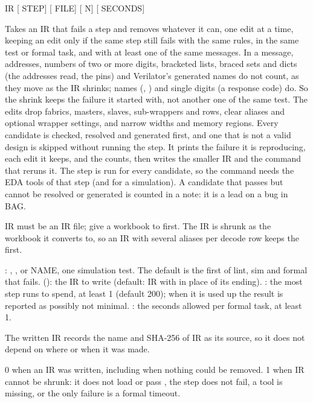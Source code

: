 \begin{entry}{ IR [ STEP] [ FILE] [ N] [ SECONDS]}
\item[Does] Takes an IR that fails a step and removes whatever it can, one edit at a time,
  keeping an edit only if the same step still fails with the same rules, in the same test or
  formal task, and with at least one of the same messages. In a message, addresses,
  numbers of two or more digits, bracketed lists, braced sets and dicts (the addresses
  read, the pins) and Verilator's generated names do not count, as they move as the IR
  shrinks; names (, ) and single digits (a response code) do. So the
  shrink keeps the failure it started with, not another one of the same test. The edits drop
  fabrics, masters, slaves, sub-wrappers and rows, clear aliases and optional wrapper
  settings, and narrow widths and memory regions. Every candidate is checked, resolved and
  generated first, and one that is not a valid design is skipped without running the step.
  It prints the failure it is reproducing, each edit it keeps, and the counts, then writes
  the smaller IR and the command that reruns it. The step is run for every candidate, so
  the command needs the EDA tools of that step (and  for a simulation).
  A candidate that passes  but cannot be resolved or generated is counted in
  a note: it is a lead on a bug in BAG.
\item[Argument] IR must be an IR file; give a workbook to  first. The IR is
  shrunk as the workbook it converts to, so an IR with several aliases per decode row
  keeps the first.
\item[Options] : , ,  or
  NAME, one simulation test. The default is the first of lint, sim and formal
  that fails.  (): the IR to write (default: IR with
   in place of its ending). : the most step runs to
  spend, at least 1 (default 200); when it is used up the result is reported as possibly
  not minimal. : the seconds allowed per formal task, at least 1.
\item[Output] The written IR records the name and SHA-256 of IR as its source, so it does
  not depend on where or when it was made.
\item[Exit status] 0 when an IR was written, including when nothing could be removed.
  1 when IR cannot be shrunk: it does not load or pass , the step does not
  fail, a tool is missing, or the only failure is a formal timeout.
\end{entry}

